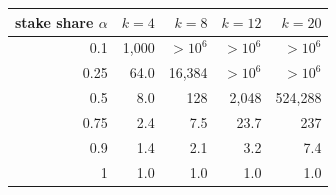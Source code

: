 \begin{tabular}{|r|r|r|r|r|}
\hline
\rowcolor{gray!15}stake share $\alpha$ & $k=4$ & $k=8$ & $k=12$ & $k=20$ \\
\hline
0.1 & 1,000 & $>10^{6}$ & $>10^{6}$ & $>10^{6}$ \\
\hline
0.25 & 64.0 & 16,384 & $>10^{6}$ & $>10^{6}$ \\
\hline
0.5 & 8.0 & 128 & 2,048 & 524,288 \\
\hline
0.75 & 2.4 & 7.5 & 23.7 & 237 \\
\hline
0.9 & 1.4 & 2.1 & 3.2 & 7.4 \\
\hline
1 & 1.0 & 1.0 & 1.0 & 1.0 \\
\hline
\end{tabular}
